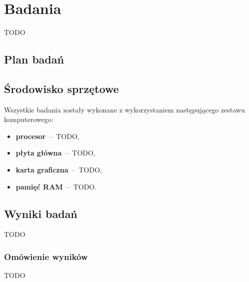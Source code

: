 \chapter{Badania}
TODO

\section{Plan badań}

\section{Środowisko sprzętowe}
Wszystkie badania zostały wykonane z wykorzystaniem następującego zestawu komputerowego:
\begin{itemize}
    \item \textbf{procesor}~--~TODO,
    \item \textbf{płyta główna}~--~TODO,
    \item \textbf{karta graficzna}~--~TODO,
    \item \textbf{pamięć RAM}~--~TODO.
\end{itemize}

\section{Wyniki badań}
TODO

\subsection{Omówienie wyników}
TODO
